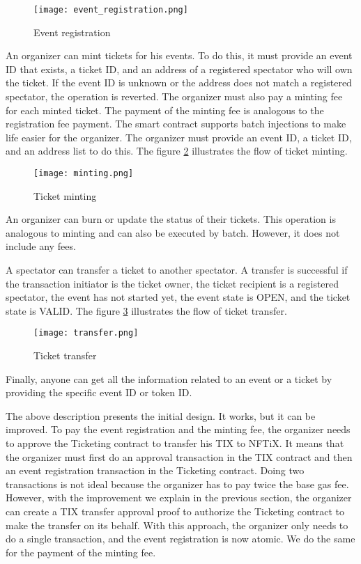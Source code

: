 \documentclass[a4paper,11pt,oneside]{report}
\begin{document}
\begin{figure}[h!]
  \texttt{[image: event\_registration.png]}
  \caption{Event registration}
  \label{fig:event_registration}
\end{figure}

An organizer can mint tickets for his events. To do this, it must provide an event ID that exists, a ticket ID, and an address of a registered spectator who will own the ticket. If the event ID is unknown or the address does not match a registered spectator, the operation is reverted. The organizer must also pay a minting fee for each minted ticket. The payment of the minting fee is analogous to the registration fee payment. The smart contract supports batch injections to make life easier for the organizer. The organizer must provide an event ID, a ticket ID, and an address list to do this. The figure \hyperref[fig:minting]{\ref{fig:minting}} illustrates the flow of ticket minting.

\begin{figure}[h!]
  \texttt{[image: minting.png]}
  \caption{Ticket minting}
  \label{fig:minting}
\end{figure}

An organizer can burn or update the status of their tickets. This operation is analogous to minting and can also be executed by batch. However, it does not include any fees.

A spectator can transfer a ticket to another spectator. A transfer is successful if the transaction initiator is the ticket owner, the ticket recipient is a registered spectator, the event has not started yet, the event state is OPEN, and the ticket state is VALID. The figure \hyperref[fig:transfer]{\ref{fig:transfer}} illustrates the flow of ticket transfer.

\begin{figure}[h!]
  \centering
  \texttt{[image: transfer.png]}
  \caption{Ticket transfer}
  \label{fig:transfer}
\end{figure}

Finally, anyone can get all the information related to an event or a ticket by providing the specific event ID or token ID.

The above description presents the initial design. It works, but it can be improved. To pay the event registration and the minting fee, the organizer needs to approve the Ticketing contract to transfer his TIX to NFTiX. It means that the organizer must first do an approval transaction in the TIX contract and then an event registration transaction in the Ticketing contract. Doing two transactions is not ideal because the organizer has to pay twice the base gas fee. However, with the improvement we explain in the previous section, the organizer can create a TIX transfer approval proof to authorize the Ticketing contract to make the transfer on its behalf. With this approach, the organizer only needs to do a single transaction, and the event registration is now atomic. We do the same for the payment of the minting fee.
\end{document}
